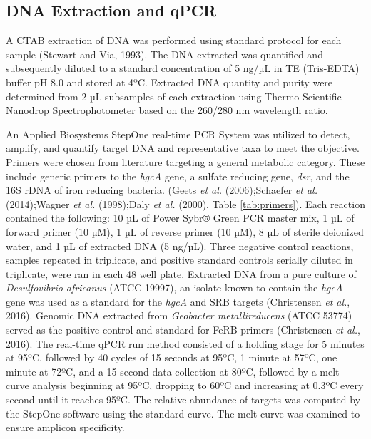 \documentclass[ms, hidelinks]{uncgdissertationexp}
\theoremstyle{plain}
\theoremstyle{definition}
\theoremstyle{remark}
\begin{document}
\hypertarget{dna-extraction-and-qpcr}{%
\subsection{DNA Extraction and qPCR}\label{dna-extraction-and-qpcr}}

A CTAB extraction of DNA was performed using standard protocol for each sample (Stewart and Via, 1993). The DNA extracted was quantified and subsequently diluted to a standard concentration of 5 ng/µL in TE (Tris-EDTA) buffer pH 8.0 and stored at 4ºC. Extracted DNA quantity and purity were determined from 2 µL subsamples of each extraction using Thermo Scientific Nanodrop Spectrophotometer based on the 260/280 nm wavelength ratio.

An Applied Biosystems StepOne real-time PCR System was utilized to detect, amplify, and quantify target DNA and representative taxa to meet the objective. Primers were chosen from literature targeting a general metabolic category. These include generic primers to the \emph{hgcA} gene, a sulfate reducing gene, \emph{dsr}, and the 16S rDNA of iron reducing bacteria. (Geets \emph{et al.} (2006);Schaefer \emph{et al.} (2014);Wagner \emph{et al.} (1998);Daly \emph{et al.} (2000), Table \ref{tab:primers}). Each reaction contained the following: 10 µL of Power Sybr® Green PCR master mix, 1 µL of forward primer (10 µM), 1 µL of reverse primer (10 µM), 8 µL of sterile deionized water, and 1 µL of extracted DNA (5 ng/µL). Three negative control reactions, samples repeated in triplicate, and positive standard controls serially diluted in triplicate, were ran in each 48 well plate. Extracted DNA from a pure culture of \emph{Desulfovibrio africanus} (ATCC 19997), an isolate known to contain the \emph{hgcA} gene was used as a standard for the \emph{hgcA} and SRB targets (Christensen \emph{et al.}, 2016). Genomic DNA extracted from \emph{Geobacter metallireducens} (ATCC 53774) served as the positive control and standard for FeRB primers (Christensen \emph{et al.}, 2016). The real-time qPCR run method consisted of a holding stage for 5 minutes at 95ºC, followed by 40 cycles of 15 seconds at 95ºC, 1 minute at 57ºC, one minute at 72ºC, and a 15-second data collection at 80ºC, followed by a melt curve analysis beginning at 95ºC, dropping to 60ºC and increasing at 0.3ºC every second until it reaches 95ºC. The relative abundance of targets was computed by the StepOne software using the standard curve. The melt curve was examined to ensure amplicon specificity.
\end{document}
